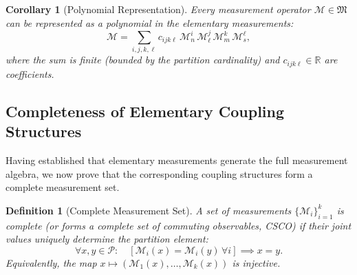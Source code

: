 \documentclass[twocolumn,10pt,a4paper]{article}
\newtheorem{corollary}[theorem]{Corollary}
\newtheorem{definition}[theorem]{Definition}
\theoremstyle{remark}
\newcommand{\partition}{\mathcal{P}}
\newcommand{\Reals}{\mathbb{R}}
\begin{document}
\begin{corollary}[Polynomial Representation]
\label{cor:polynomial_representation}
Every measurement operator $\mathcal{M} \in \mathfrak{M}$ can be represented as a polynomial in the elementary measurements:
\begin{equation}
\mathcal{M} = \sum_{i,j,k,\ell} c_{ijk\ell} \, \mathcal{M}_n^i \, \mathcal{M}_\ell^j \, \mathcal{M}_m^k \, \mathcal{M}_s^\ell,
\end{equation}
where the sum is finite (bounded by the partition cardinality) and $c_{ijk\ell} \in \Reals$ are coefficients.
\end{corollary}

\subsection{Completeness of Elementary Coupling Structures}

Having established that elementary measurements generate the full measurement algebra, we now prove that the corresponding coupling structures form a complete measurement set.

\begin{definition}[Complete Measurement Set]
\label{def:complete_set}
A set of measurements $\{\mathcal{M}_i\}_{i=1}^k$ is \emph{complete} (or forms a \emph{complete set of commuting observables}, CSCO) if their joint values uniquely determine the partition element:
\begin{equation}
\forall x, y \in \partition: \quad [\mathcal{M}_i(x) = \mathcal{M}_i(y) \, \forall i] \implies x = y.
\end{equation}
Equivalently, the map $x \mapsto (\mathcal{M}_1(x), \ldots, \mathcal{M}_k(x))$ is injective.
\end{definition}
\end{document}
